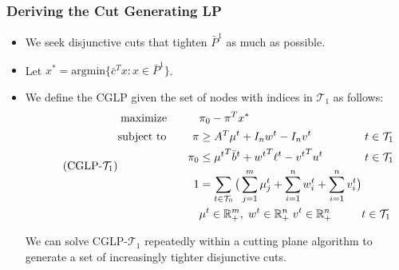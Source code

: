 \documentclass{beamer}
\begin{document}
	\begin{frame}[t]
		\frametitle{Deriving the Cut Generating LP}
		\small
		\begin{itemize}
			\item We seek disjunctive cuts that tighten $ \bar{P}^1 $ as much as possible.
			\item Let $ x^* = \text{argmin}\{\bar{c}^T x : x \in \bar{P}^1 \} $.
			\item We define the CGLP given the set of nodes with indices in $ \mathcal{T}_1 $ as follows:
			\begin{equation} \tag{CGLP-$ \mathcal{T}_1 $}
				\begin{alignedat}{2} \label{e:cglp} 
					\text{maximize } \; \; \qquad & \pi_0 - \pi^T x^* && \\
					\text{subject to } \qquad \pi & \geq A^T \mu^{t} + I_n w^{t} - I_n v^{t} && \;  t \in \mathcal{T}_1 \\
					\pi_0 & \leq {\mu^{t}}^T \bar{b}^{t} + {w^{t}}^T \ell^{t} - {v^{t}}^T u^{t} && \; t \in \mathcal{T}_1 \\
					1 & = \sum_{t \in \mathcal{T}_0} \big( \sum_{j=1}^{m} \mu_j^{t} + \sum_{i=1}^{n} w_i^{t} + \sum_{i=1}^{n} v_i^{t} \big) && \\
					& \mu^{t} \in \Rmbb_+^{m}, \; w^{t} \in \Rmbb_+^n \; v^{t} \in \Rmbb_+^n && t \in \mathcal{T}_1
				\end{alignedat}
			\end{equation}
			\begin{block}{}
				We can solve CGLP-$ \mathcal{T}_1 $ repeatedly within a cutting plane algorithm to generate a set of increasingly tighter disjunctive cuts.
			\end{block}
		\end{itemize}
		\normalsize
	\end{frame}
\end{document}
